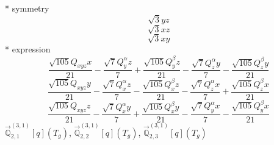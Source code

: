 \documentclass[fleqn,8pt]{jsarticle}
\begin{document}
\noindent\quad ** symmetry
\begin{dmath*}
\sqrt{3} y z
\end{dmath*}
\begin{dmath*}
\sqrt{3} x z
\end{dmath*}
\begin{dmath*}
\sqrt{3} x y
\end{dmath*}
\noindent\quad ** expression
\begin{dmath*}
\frac{\sqrt{105} Q_{xyz} x}{21} - \frac{\sqrt{7} Q_{y}^{\alpha} z}{7} + \frac{\sqrt{105} Q_{y}^{\beta} z}{21} - \frac{\sqrt{7} Q_{z}^{\alpha} y}{7} - \frac{\sqrt{105} Q_{z}^{\beta} y}{21}
\end{dmath*}
\begin{dmath*}
\frac{\sqrt{105} Q_{xyz} y}{21} - \frac{\sqrt{7} Q_{x}^{\alpha} z}{7} - \frac{\sqrt{105} Q_{x}^{\beta} z}{21} - \frac{\sqrt{7} Q_{z}^{\alpha} x}{7} + \frac{\sqrt{105} Q_{z}^{\beta} x}{21}
\end{dmath*}
\begin{dmath*}
\frac{\sqrt{105} Q_{xyz} z}{21} - \frac{\sqrt{7} Q_{x}^{\alpha} y}{7} + \frac{\sqrt{105} Q_{x}^{\beta} y}{21} - \frac{\sqrt{7} Q_{y}^{\alpha} x}{7} - \frac{\sqrt{105} Q_{y}^{\beta} x}{21}
\end{dmath*}
\noindent\quad $\vec{\mathbb{Q}}_{2,1}^{(3,1)}[q](T_{g})$, $\vec{\mathbb{Q}}_{2,2}^{(3,1)}[q](T_{g})$, $\vec{\mathbb{Q}}_{2,3}^{(3,1)}[q](T_{g})$
\end{document}
